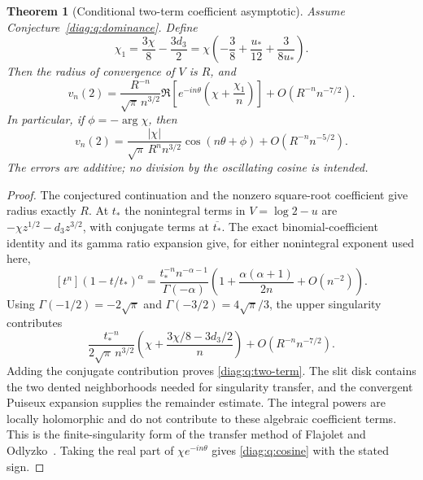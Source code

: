 \documentclass[11pt,a4paper]{article}
\newtheorem{theorem}{Theorem}[section]
\theoremstyle{definition}
\theoremstyle{remark}
\numberwithin{equation}{section}
\begin{document}
\begin{theorem}[Conditional two-term coefficient asymptotic]
\label{diag:q:conditional-asymptotic}
Assume Conjecture~\ref{diag:q:dominance}.  Define
\begin{equation}\label{diag:q:c1}
 \chi_1=\frac{3\chi}{8}-\frac{3d_3}{2}
     =\chi\left(-\frac38+\frac{u_*}{12}+\frac3{8u_*}\right).
\end{equation}
Then the radius of convergence of $V$ is $R$, and
\begin{equation}\label{diag:q:two-term}
 v_n(2)=\frac{R^{-n}}{\sqrt\pi\,n^{3/2}}
       \Re\!\left[e^{-in\theta}
                    \left(\chi+\frac{\chi_1}{n}\right)\right]
       +O\!\left(R^{-n}n^{-7/2}\right).
\end{equation}
In particular, if $\phi=-\arg \chi$, then
\begin{equation}\label{diag:q:cosine}
 v_n(2)=\frac{|\chi|}{\sqrt\pi\,R^n n^{3/2}}
                 \cos(n\theta+\phi)
          +O\!\left(R^{-n}n^{-5/2}\right).
\end{equation}
The errors are additive; no division by the oscillating cosine is intended.
\end{theorem}

\begin{proof}
The conjectured continuation and the nonzero square-root coefficient
give radius exactly $R$.  At $t_*$ the nonintegral terms in $V=\log2-u$
are $-\chi z^{1/2}-d_3z^{3/2}$, with conjugate terms at
$\overline{t_*}$.  The exact binomial-coefficient identity and its gamma
ratio expansion give, for either nonintegral exponent used here,
\[
 [t^n](1-t/t_*)^\alpha
 =\frac{t_*^{-n}n^{-\alpha-1}}{\Gamma(-\alpha)}
   \left(1+\frac{\alpha(\alpha+1)}{2n}+O(n^{-2})\right).
\]
Using $\Gamma(-1/2)=-2\sqrt\pi$ and
$\Gamma(-3/2)=4\sqrt\pi/3$, the upper singularity contributes
\[
 \frac{t_*^{-n}}{2\sqrt\pi\,n^{3/2}}
 \left(\chi+\frac{3\chi/8-3d_3/2}{n}\right)
 +O(R^{-n}n^{-7/2}).
\]
Adding the conjugate contribution proves \eqref{diag:q:two-term}.
The slit disk contains the two dented neighborhoods needed for
singularity transfer, and the convergent Puiseux expansion supplies the
remainder estimate.  The integral powers are locally holomorphic and do
not contribute to these algebraic coefficient terms.  This is the
finite-singularity form of the transfer method of
Flajolet and Odlyzko~\cite{FlajoletOdlyzko1990}.  Taking the real part of
$\chi e^{-in\theta}$ gives \eqref{diag:q:cosine} with the stated sign.
\end{proof}
\end{document}
